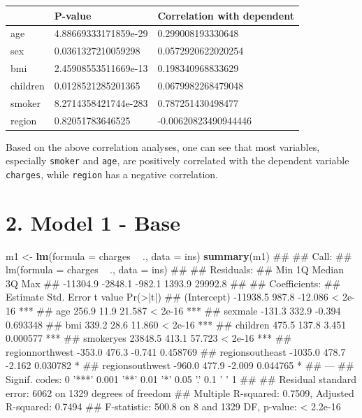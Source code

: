 \documentclass[]{article}
\newenvironment{Shaded}{\begin{snugshade}}{\end{snugshade}}
\newcommand{\KeywordTok}[1]{\textcolor[rgb]{0.13,0.29,0.53}{\textbf{#1}}}
\newcommand{\DataTypeTok}[1]{\textcolor[rgb]{0.13,0.29,0.53}{#1}}
\newcommand{\StringTok}[1]{\textcolor[rgb]{0.31,0.60,0.02}{#1}}
\newcommand{\OperatorTok}[1]{\textcolor[rgb]{0.81,0.36,0.00}{\textbf{#1}}}
\newcommand{\NormalTok}[1]{#1}
\begin{document}
\begin{longtable}[]{@{}lll@{}}
\toprule
& P-value & Correlation with dependent\tabularnewline
\midrule
\endhead
age & 4.88669333171859e-29 & 0.299008193330648\tabularnewline
sex & 0.0361327210059298 & 0.0572920622020254\tabularnewline
bmi & 2.45908553511669e-13 & 0.198340968833629\tabularnewline
children & 0.0128521285201365 & 0.0679982268479048\tabularnewline
smoker & 8.2714358421744e-283 & 0.787251430498477\tabularnewline
region & 0.82051783646525 & -0.00620823490944446\tabularnewline
\bottomrule
\end{longtable}

Based on the above correlation analyses, one can see that most
variables, especially \texttt{smoker} and \texttt{age}, are positively
correlated with the dependent variable \texttt{charges}, while
\texttt{region} has a negative correlation.

\section{2. Model 1 - Base}\label{model-1---base}

\begin{Shaded}
\begin{Highlighting}[]
\NormalTok{m1 <-}\StringTok{ }\KeywordTok{lm}\NormalTok{(}\DataTypeTok{formula =}\NormalTok{ charges }\OperatorTok{~}\StringTok{ }\NormalTok{.,}
         \DataTypeTok{data =}\NormalTok{ ins)}
\KeywordTok{summary}\NormalTok{(m1)}
\NormalTok{## }
\NormalTok{## Call:}
\NormalTok{## lm(formula = charges ~ ., data = ins)}
\NormalTok{## }
\NormalTok{## Residuals:}
\NormalTok{##      Min       1Q   Median       3Q      Max }
\NormalTok{## -11304.9  -2848.1   -982.1   1393.9  29992.8 }
\NormalTok{## }
\NormalTok{## Coefficients:}
\NormalTok{##                 Estimate Std. Error t value Pr(>|t|)    }
\NormalTok{## (Intercept)     -11938.5      987.8 -12.086  < 2e-16 ***}
\NormalTok{## age                256.9       11.9  21.587  < 2e-16 ***}
\NormalTok{## sexmale           -131.3      332.9  -0.394 0.693348    }
\NormalTok{## bmi                339.2       28.6  11.860  < 2e-16 ***}
\NormalTok{## children           475.5      137.8   3.451 0.000577 ***}
\NormalTok{## smokeryes        23848.5      413.1  57.723  < 2e-16 ***}
\NormalTok{## regionnorthwest   -353.0      476.3  -0.741 0.458769    }
\NormalTok{## regionsoutheast  -1035.0      478.7  -2.162 0.030782 *  }
\NormalTok{## regionsouthwest   -960.0      477.9  -2.009 0.044765 *  }
\NormalTok{## ---}
\NormalTok{## Signif. codes:  0 '***' 0.001 '**' 0.01 '*' 0.05 '.' 0.1 ' ' 1}
\NormalTok{## }
\NormalTok{## Residual standard error: 6062 on 1329 degrees of freedom}
\NormalTok{## Multiple R-squared:  0.7509, Adjusted R-squared:  0.7494 }
\NormalTok{## F-statistic: 500.8 on 8 and 1329 DF,  p-value: < 2.2e-16}
\end{Highlighting}
\end{Shaded}
\end{document}
